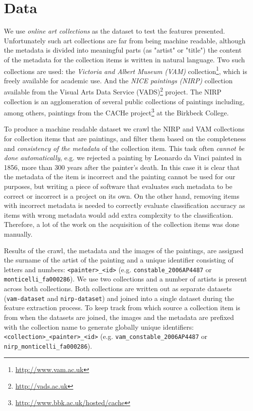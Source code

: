 \documentclass[11pt,a4paper,twoside,openright]{report}
\begin{document}

\chapter{Data}
\label{chap:data}

We use \emph{online art collections} as the dataset to test the features
presented.  Unfortunately such art collections are far from being machine
readable, although the metadata is divided into meaningful parts (as "artist"
or "title") the content of the metadata for the collection items is written in
natural language.  Two such collections are used: the \emph{Victoria and Albert
Museum (VAM)} collection\footnote{\href{http://www.vam.ac.uk/}
{http://www.vam.ac.uk}}, which is freely available for academic use.  And the
\emph{NICE paintings (NIRP)} collection available from the Visual Arts Data
Service (VADS)\footnote{\href{http://vads.ac.uk/}{http://vads.ac.uk}} project.
The NIRP collection is an agglomeration of several public collections of
paintings including, among others, paintings from the CACHe project\footnote{
\href{http://www.bbk.ac.uk/hosted/cache/}{http://www.bbk.ac.uk/hosted/cache}}
at the Birkbeck College.

To produce a machine readable dataset we crawl the NIRP and VAM collections for
collection items that are paintings, and filter them based on the completeness
and \emph{consistency of the metadata} of the collection item.  This task often
\emph{cannot be done automatically}, e.g. we rejected a painting by Leonardo da
Vinci painted in 1856, more than 300 years after the painter's death.  In this
case it is clear that the metadata of the item is incorrect and the painting
cannot be used for our purposes, but writing a piece of software that evaluates
such metadata to be correct or incorrect is a project on its own.  On the other
hand, removing items with incorrect metadata is needed to correctly evaluate
classification accuracy as items with wrong metadata would add extra complexity
to the classification.  Therefore, a lot of the work on the acquisition of the
collection items was done manually.

Results of the crawl, the metadata and the images of the paintings, are
assigned the surname of the artist of the painting and a unique identifier
consisting of letters and numbers: \texttt{<painter>\_<id>} (e.g.
\texttt{constable\_2006AP4487} or \texttt{monticelli\_fa000286}).  We use two
collections and a number of artists is present across both collections.  Both
collections are written out as separate datasets (\texttt{vam-dataset} and
\texttt{nirp-dataset}) and joined into a single dataset during the feature
extraction process.  To keep track from which source a collection item is from
when the datasets are joined, the images and the metadata are prefixed with the
collection name to generate globally unique identifiers:
\texttt{<collection>\_<painter>\_<id>} (e.g.
\texttt{vam\_constable\_2006AP4487} or \texttt{nirp\_monticelli\_fa000286}).
\end{document}
